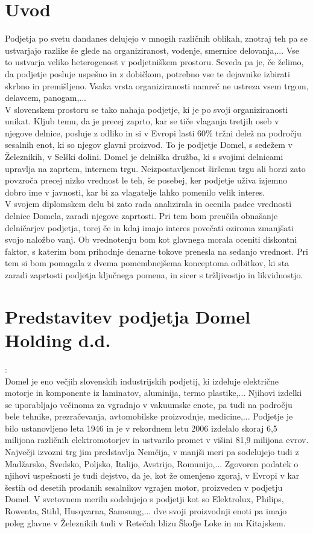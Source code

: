 \documentclass[12pt,a4paper]{amsart}
\theoremstyle{definition} %
\theoremstyle{plain} %
\begin{document}
\section{Uvod}
Podjetja po svetu dandanes delujejo v mnogih različnih oblikah, znotraj teh pa se ustvarjajo razlike še glede na organiziranost, vodenje, smernice delovanja,... Vse to ustvarja veliko heterogenost v podjetniškem prostoru. Seveda pa je, če želimo, da podjetje posluje uspešno in z dobičkom, potrebno vse te dejavnike izbirati skrbno in premišljeno. Vsaka vrsta organiziranosti namreč ne ustreza vsem trgom, delavcem, panogam,... \\
V slovenskem prostoru se tako nahaja podjetje, ki je po svoji organiziranosti unikat. Kljub temu, da je precej zaprto, kar se tiče vlaganja tretjih oseb v njegove delnice, posluje z odliko in si v Evropi lasti 60\% tržni delež na področju sesalnih enot, ki so njegov glavni proizvod. To je podjetje Domel, s sedežem v Železnikih, v Selški dolini. Domel je delniška družba, ki s svojimi delnicami upravlja na zaprtem, internem trgu. Neizpostavljenost širšemu trgu ali borzi zato povzroča precej nizko vrednost le teh, še posebej, ker podjetje uživa izjemno dobro ime v javnosti, kar bi za vlagatelje lahko pomenilo velik interes.\\
V svojem diplomskem delu bi zato rada analizirala in ocenila padec vrednosti delnice Domela, zaradi njegove zaprtosti. Pri tem bom preučila obnašanje delničarjev podjetja, torej če in kdaj imajo interes povečati oziroma zmanjšati svojo naložbo vanj. Ob vrednotenju bom kot glavnega morala oceniti diskontni faktor, s katerim bom prihodnje denarne tokove prenesla na sedanjo vrednost. Pri tem si bom pomagala z dvema pomembnejšema konceptoma odbitkov, ki sta zaradi zaprtosti podjetja ključnega pomena, in sicer s tržljivostjo in likvidnostjo.
\newpage

\section{Predstavitev podjetja Domel Holding d.d.}:\\
Domel je eno večjih slovenskih industrijskih podjetij, ki izdeluje električne motorje in komponente iz laminatov, aluminija, termo plastike,... Njihovi izdelki se uporabljajo večinoma za vgradnjo v vakuumske enote, pa tudi na področju bele tehnike, prezračevanja, avtomobilske proizvodnje, medicine,...
Podjetje je bilo ustanovljeno leta 1946 in je v rekordnem letu 2006 izdelalo skoraj 6,5 milijona različnih elektromotorjev in ustvarilo promet v višini 81,9 milijona evrov. Največji izvozni trg jim predstavlja Nemčija, v manjši meri pa sodelujejo tudi z Madžarsko, Švedsko, Poljsko, Italijo, Avstrijo, Romunijo,... Zgovoren podatek o njihovi uspešnosti je tudi dejstvo, da je, kot že omenjeno zgoraj, v Evropi v kar šestih od desetih prodanih sesalnikov vgrajen motor, proizveden v podjetju Domel. V svetovnem merilu sodelujejo s podjetji kot so Elektrolux, Philips, Rowenta, Stihl, Husqvarna, Samsung,... dve svoji proizvodnji enoti pa imajo poleg glavne v Železnikih tudi v Retečah blizu Škofje Loke in na Kitajskem.
\end{document}
